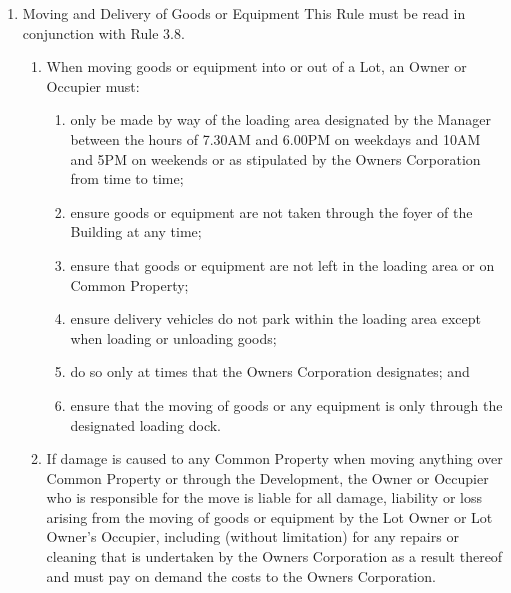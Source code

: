\documentclass{article}
\begin{document}
\begin{enumerate}[label=\arabic*.]
\begin{enumerate}[label=\arabic{enumi}.\arabic*.]
\begin{enumerate}[label=(\arabic*)]
\end{enumerate}

\item  Moving and Delivery of Goods or Equipment This Rule must be read in conjunction with Rule 3.8.

\begin{enumerate}[label=(\arabic*)]

\item  When moving goods or equipment into or out of a Lot, an Owner or Occupier must:

\begin{enumerate}[label=(\alph*)]

\item  only be made by way of the loading area designated by the Manager between the hours of 7.30AM and 6.00PM on weekdays and 10AM and 5PM on weekends or as stipulated by the Owners Corporation from time to time;

\item  ensure goods or equipment are not taken through the foyer of the Building at any time;

\item  ensure that goods or equipment are not left in the loading area or on Common Property;

\item  ensure delivery vehicles do not park within the loading area except when loading or unloading goods;

\item  do so only at times that the Owners Corporation designates; and

\item  ensure that the moving of goods or any equipment is only through the designated loading dock.

\end{enumerate}

\item  If damage is caused to any Common Property when moving anything over Common Property or through the Development, the Owner or Occupier who is responsible for the move is liable for all damage, liability or loss arising from the moving of goods or equipment by the Lot Owner or Lot Owner’s Occupier, including (without limitation) for any repairs or cleaning that is undertaken by the Owners Corporation as a result thereof and must pay on demand the costs to the Owners Corporation.

\end{enumerate}


\end{enumerate}
\end{enumerate}
\end{document}
